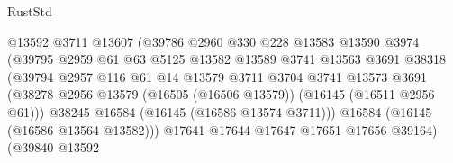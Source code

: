 \begin{lexlean}{RustStd}
\begin{coremodule}
                                        @13592
                                        @3711
                                        @13607
                                        (@39786
                                          @2960
                                          @330
                                          @228
                                          @13583
                                          @13590
                                          @3974
                                          (@39795
                                            @2959
                                            @61
                                            @63
                                            @5125
                                            @13582
                                            @13589
                                            @3741
                                            @13563
                                            @3691
                                            @38318
                                            (@39794
                                              @2957
                                              @116
                                              @61
                                              @14
                                              @13579
                                              @3711
                                              @3704
                                              @3741
                                              @13573
                                              @3691
                                              (@38278
                                                @2956
                                                @13579
                                                (@16505 (@16506 @13579))
                                                (@16145 (@16511 @2956 @61)))
                                              @38245
                                              @16584
                                              (@16145 (@16586 @13574 @3711)))
                                            @16584
                                            (@16145 (@16586 @13564 @13582)))
                                          @17641
                                          @17644
                                          @17647
                                          @17651
                                          @17656
                                          @39164)
                                        (@39840
                                          @13592

\end{coremodule}
\end{lexlean}
